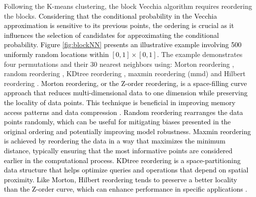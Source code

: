 \documentclass[12pt]{article}
\begin{document}

Following the K-means clustering, the block Vecchia algorithm requires reordering the blocks. \textcolor{black}{Considering that the conditional probability in the Vecchia approximation is sensitive to its previous points, the ordering is crucial as it influences the selection of candidates for approximating the conditional probability.
Figure \ref{fig:blockNN} presents an illustrative example involving 500 uniformly random locations within $[0, 1]\times[0, 1]$.}
The example demonstrates four permutations and their 30 nearest neighbors using: Morton reordering \citep{walker2018morton}, random reordering \citep{guinness2018permutation}, KDtree reordering \citep{bentley1975multidimensional}
, maxmin reordering (mmd) \cite{guinness2018permutation} and Hilbert reordering \citep{hilbert1935stetige, chen2024impact}. \textcolor{black}{Morton reordering, or the Z-order reordering, is a space-filling curve approach that reduces multi-dimensional data to one dimension while preserving the locality of data points. This technique is beneficial in improving memory access patterns and data compression \citep{walker2018morton}. 
Random reordering rearranges the data points randomly, which can be useful for mitigating biases presented in the original ordering and potentially improving model robustness. Maxmin reordering is achieved by reordering the data in a way that maximizes the minimum distance, typically ensuring that the most informative points are considered earlier in the computational process. 
KDtree reordering is a space-partitioning data structure that helps optimize queries and operations that depend on spatial proximity.
Like Morton, Hilbert reordering tends to preserve a better locality than the Z-order curve, which can enhance performance in specific applications \citep{chen2022hilbert}.
}

\end{document}

